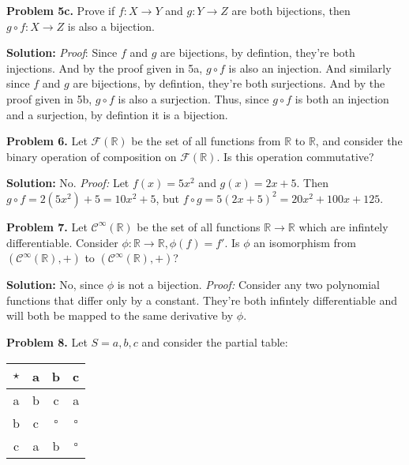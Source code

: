 \documentclass[12pt, letterpaper]{article}
\newenvironment{problem}
    [1]
    {\noindent \textbf{Problem #1.}}
    {\vspace{3mm}}
\newenvironment{solution}
    [0]
    {\noindent \textbf{Solution:}} 
    {\vspace{3mm}}
\begin{document}
    \begin{problem}{5c}
        Prove if $f:X \rightarrow Y$ and $g: Y \rightarrow Z$ are both bijections,
        then $g \circ f: X \rightarrow Z$ is also a bijection.
    \end{problem}

    \begin{solution}
        \emph{Proof}: Since $f$ and $g$ are bijections, by defintion, they're both
        injections. And by the proof given in 5a, $g \circ f$ is also an injection.
        And similarly since $f$ and $g$ are bijections, by defintion, they're both
        surjections. And by the proof given in 5b, $g \circ f$ is also a surjection.
        Thus, since $g \circ f$ is both an injection and a surjection, by defintion
        it is a bijection.
    \end{solution}

    \begin{problem}{6}
        Let $\mathcal{F}(\mathbb{R})$ be the set of all functions from $\mathbb{R}$ to 
        $\mathbb{R}$, and consider the binary operation of composition on
        $\mathcal{F}(\mathbb{R})$. Is this operation commutative?
    \end{problem}

    \begin{solution}
        No. \emph{Proof:} Let $f(x)=5x^2$ and $g(x)=2x+5$. Then $g \circ f = 2(5x^2)+5 = 
        10x^2 + 5$, but $f \circ g = 5(2x+5)^2 = 20x^2+100x+125$.
    \end{solution}

    \begin{problem}{7}
        Let $\mathcal{C}^\infty(\mathbb{R})$ be the set of all functions
        $\mathbb{R} \rightarrow \mathbb{R}$ which are infintely differentiable.
        Consider $\phi: \mathbb{R} \rightarrow \mathbb{R}, \phi(f) = f'$. Is
        $\phi$ an isomorphism from $(\mathcal{C}^\infty(\mathbb{R}), +)$ to
        $(\mathcal{C}^\infty(\mathbb{R}), +)$?
    \end{problem}

    \begin{solution}
        No, since $\phi$ is not a bijection. \emph{Proof:} Consider any two 
        polynomial functions that differ only by a constant. They're both
        infintely differentiable and will both be mapped to the same derivative
        by $\phi$.
    \end{solution}

    \begin{problem}{8}
        Let $S = {a, b, c}$ and consider the partial table:
        \begin{center}
        \begin{tabular}{ c | c c c } 
            $\star$ & a & b & c \\ 
            \hline
            a & b & c & a \\ 
            b & c & $\square$ & $\square$ \\ 
            c & a & b & $\square$ \\ 
        \end{tabular}
        \end{center}
    \end{problem}
\end{document}
